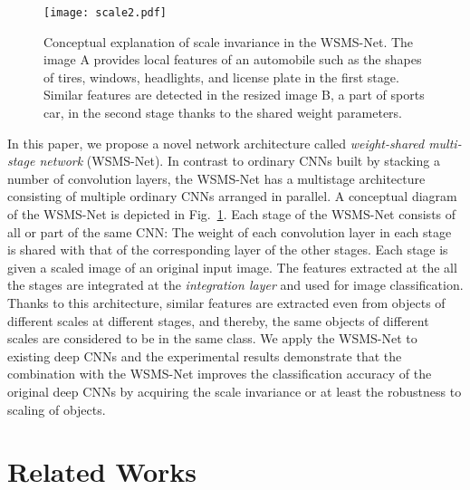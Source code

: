 \documentclass[journal]{IEEEtran}
\begin{document}
\begin{figure}[!t]
\centering
\texttt{[image: scale2.pdf]}
\caption{Conceptual explanation of scale invariance in the WSMS-Net.
The image A provides local features of an automobile such as the shapes of tires, windows, headlights, and license plate in the first stage.
Similar features are detected in the resized image B, a part of sports car, in the second stage thanks to the shared weight parameters.}
\label{fig:scale}
\end{figure}

In this paper, we propose a novel network architecture called \emph{weight-shared multi-stage network} (WSMS-Net).
In contrast to ordinary CNNs built by stacking a number of convolution layers, the WSMS-Net has a multistage architecture consisting of multiple ordinary CNNs arranged in parallel.
A conceptual diagram of the WSMS-Net is depicted in Fig.~\ref{fig:scale}.
Each stage of the WSMS-Net consists of all or part of the same CNN: The weight of each convolution layer in each stage is shared with that of the corresponding layer of the other stages.
Each stage is given a scaled image of an original input image.
The features extracted at the all the stages are integrated at the \emph{integration layer} and used for image classification.
Thanks to this architecture, similar features are extracted even from objects of different scales at different stages, and thereby, the same objects of different scales are considered to be in the same class.
We apply the WSMS-Net to existing deep CNNs and the experimental results demonstrate that the combination with the WSMS-Net improves the classification accuracy of the original deep CNNs by acquiring the scale invariance or at least the robustness to scaling of objects.


\section{Related Works}
\end{document}
